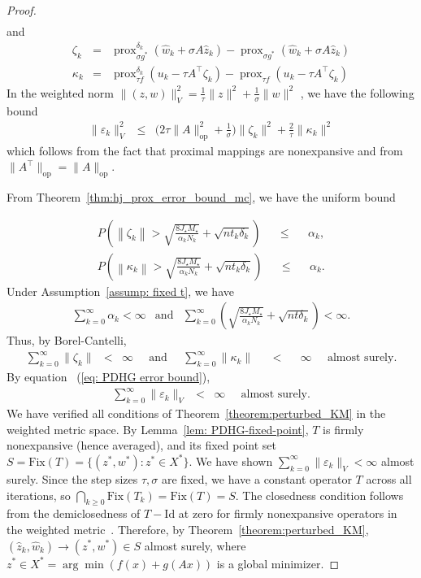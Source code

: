 \documentclass{article}
\newcommand{\prox}{\operatorname{prox}}
\newcommand{\amp}{\mathop{\:\:\,}\nolimits}
\theoremstyle{plain}
\theoremstyle{definition}
\theoremstyle{remark}
\begin{document}
\begin{proof}
\begin{eqnarray}
\end{eqnarray}
and 
\begin{eqnarray}
    \zeta_k &=& \prox^{\delta_k}_{\sigma g^*}(\hat{w}_k + \sigma A\hat{z}_k) - \prox_{\sigma g^*}(\hat{w}_k + \sigma A\hat{z}_k) \\
    \kappa_k &=& \prox^{\delta_k}_{\tau f}(u_k - \tau A^\top \zeta_k) - \prox_{\tau f}(u_k - \tau A^\top \zeta_k)
\end{eqnarray}
In the weighted norm $\|(z,w)\|_V^2 = \frac{1}{\tau} \|z\|^2 + \frac{1}{\sigma}\|w\|^2$ , we have the following bound
\begin{eqnarray}\label{eq: PDHG error bound}
    \| \varepsilon_k\|^2_V &\leq& \big(2\tau\|A\|_{\text{op}}^2 + \frac{1}{\sigma}\big)\|\zeta_k\|^2 + \frac{2}{\tau}\|\kappa_k\|^2
\end{eqnarray}
which follows from the fact that proximal mappings are nonexpansive and from $\|A^\top\|_{\text{op}} = \|A\|_{\text{op}}$.

From Theorem~\ref{thm:hj_prox_error_bound_mc}, we have the uniform bound

\begin{eqnarray}
    P\left(\left\|\zeta_k\right\| > \sqrt{\frac{8J_\star M_\star}{\alpha_k N_k}} +\sqrt{nt_k\delta_k}\right) \amp \leq \amp \alpha_k,\\
    P\left(\left\|\kappa_k\right\| > \sqrt{\frac{8J_\star M_\star}{\alpha_k N_k}} +\sqrt{nt_k\delta_k}\right) \amp \leq \amp \alpha_k.
\end{eqnarray}
Under Assumption~\ref{assump: fixed t}, we have
\begin{eqnarray}
    \sum_{k=0}^\infty \alpha_k < \infty &\text{and}& \sum_{k=0}^\infty \left(\sqrt{\frac{8J_\star M_\star}{\alpha_k N_k}}+\sqrt{nt\delta_k}\right)< \infty.
\end{eqnarray}
Thus, by Borel-Cantelli, 
\begin{eqnarray}
\sum_{k=0}^\infty \|\zeta_k\| &<& \infty  \amp\text{and}\amp   \sum_{k=0}^\infty \|\kappa_k\| \amp < \amp \infty  \amp \text{almost surely}.
\end{eqnarray}
By equation ~(\ref{eq: PDHG error bound}),
\begin{eqnarray}
    \sum_{k=0}^\infty \|\varepsilon_k\|_V &<& \infty \amp \text{almost surely}.
\end{eqnarray}
We have verified all conditions of Theorem~\ref{theorem:perturbed_KM} in the weighted metric space. By Lemma~\ref{lem: PDHG-fixed-point}, $T$ is firmly nonexpansive (hence averaged), and its fixed point set $S = \mathrm{Fix}(T) = \{(z^*,w^*) : z^* \in X^*\}$. We have shown $\sum_{k=0}^\infty \|\varepsilon_k\|_V < \infty$ almost surely. Since the step sizes $\tau, \sigma$ are fixed, we have a constant operator $T$ across all iterations, so $\bigcap_{k \geq 0} \mathrm{Fix}(T_k) = \mathrm{Fix}(T) = S$. The closedness condition follows from the demiclosedness of $T - \mathrm{Id}$ at zero for firmly nonexpansive operators in the weighted metric~\cite{Combettes2001}. Therefore, by Theorem~\ref{theorem:perturbed_KM}, $(\hat{z}_k,\hat{w}_k) \to (z^*,w^*) \in S$ almost surely, where $z^* \in X^* = \arg\min(f(x) + g(Ax))$ is a global minimizer.
\end{proof}
\end{document}

